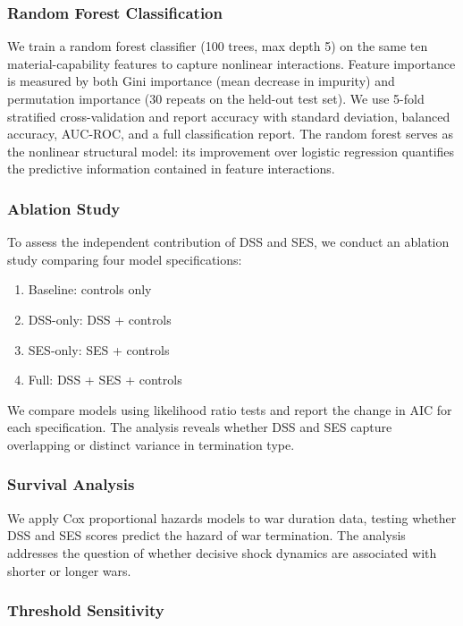 \subsubsection{Random Forest Classification}

We train a random forest classifier (100 trees, max depth 5) on the same ten material-capability features to capture nonlinear interactions. Feature importance is measured by both Gini importance (mean decrease in impurity) and permutation importance (30 repeats on the held-out test set). We use 5-fold stratified cross-validation and report accuracy with standard deviation, balanced accuracy, AUC-ROC, and a full classification report. The random forest serves as the nonlinear structural model: its improvement over logistic regression quantifies the predictive information contained in feature interactions.

\subsubsection{Ablation Study}

To assess the independent contribution of DSS and SES, we conduct an ablation study comparing four model specifications:
\begin{enumerate}
    \item Baseline: controls only
    \item DSS-only: DSS + controls
    \item SES-only: SES + controls
    \item Full: DSS + SES + controls
\end{enumerate}

We compare models using likelihood ratio tests and report the change in AIC for each specification. The analysis reveals whether DSS and SES capture overlapping or distinct variance in termination type.

\subsubsection{Survival Analysis}

We apply Cox proportional hazards models to war duration data, testing whether DSS and SES scores predict the hazard of war termination. The analysis addresses the question of whether decisive shock dynamics are associated with shorter or longer wars.

\subsubsection{Threshold Sensitivity}


